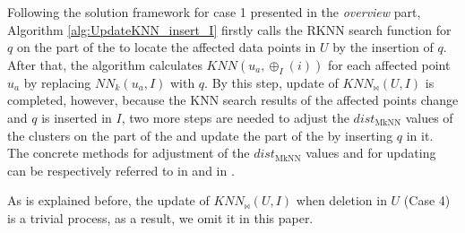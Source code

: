 Following the solution framework for case 1 presented in the \textit{overview} part, Algorithm \ref{alg:UpdateKNN_insert_I} firstly calls the RKNN search function for $q$ on the \hdrtree part of the \dualtree to locate the affected data points in $U$ by the insertion of $q$. After that, the algorithm calculates $KNN(u_a, \oplus_{I}(i))$ for each affected point $u_a$ by replacing $NN_{k}(u_a,I)$ with $q$. By this step, update of $KNN_{\bowtie}(U,I)$ is completed, however, because the KNN search results of the affected points change and $q$ is inserted in $I$, two more steps are needed to adjust the $dist_{\text{MkNN}}$ values of the clusters on the \hdrtree part of the \dualtree and update the \deltatree part of the \dualtree by inserting $q$ in it. The concrete methods for adjustment of the $dist_{\text{MkNN}}$ values and for updating \deltatree can be respectively referred to in \cite{yang2014continuous} and in \cite{cui2003contorting}.

As is explained before, the update of $KNN_{\bowtie}(U,I)$ when deletion in $U$ (Case 4) is a trivial process, as a result, we omit it in this paper.

